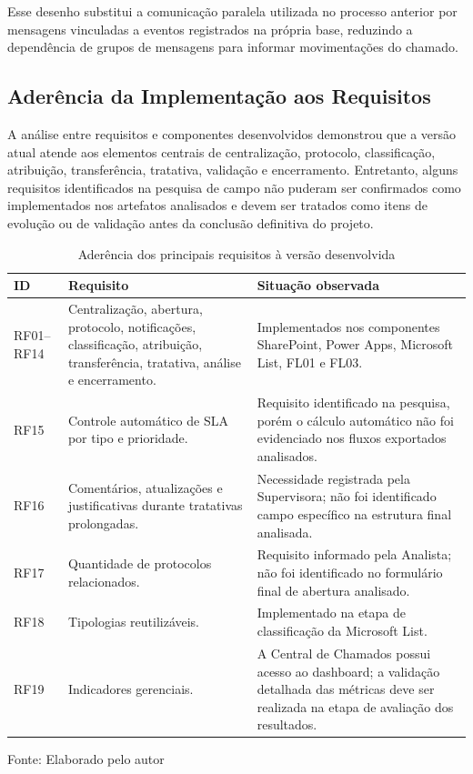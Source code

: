 Esse desenho substitui a comunicação paralela utilizada no
processo anterior por mensagens vinculadas a eventos
registrados na própria base, reduzindo a dependência de
grupos de mensagens para informar movimentações do chamado.

\subsection{Aderência da Implementação aos Requisitos}

A análise entre requisitos e componentes desenvolvidos
demonstrou que a versão atual atende aos elementos centrais
de centralização, protocolo, classificação, atribuição,
transferência, tratativa, validação e encerramento.
Entretanto, alguns requisitos identificados na pesquisa de
campo não puderam ser confirmados como implementados nos
artefatos analisados e devem ser tratados como itens de
evolução ou de validação antes da conclusão definitiva do
projeto.

\begin{table}[H]
\caption{Aderência dos principais requisitos à versão desenvolvida}
\label{tab:aderencia-requisitos}
\centering
\begin{tabular}{p{1.2cm} p{6.6cm} p{4.4cm}}
\hline
\textbf{ID} & \textbf{Requisito} &
\textbf{Situação observada} \\
\hline
RF01--RF14 &
Centralização, abertura, protocolo, notificações,
classificação, atribuição, transferência, tratativa,
análise e encerramento. &
Implementados nos componentes SharePoint, Power Apps,
Microsoft List, FL01 e FL03. \\
\hline
RF15 &
Controle automático de SLA por tipo e prioridade. &
Requisito identificado na pesquisa, porém o cálculo
automático não foi evidenciado nos fluxos exportados
analisados. \\
\hline
RF16 &
Comentários, atualizações e justificativas durante
tratativas prolongadas. &
Necessidade registrada pela Supervisora; não foi
identificado campo específico na estrutura final analisada. \\
\hline
RF17 &
Quantidade de protocolos relacionados. &
Requisito informado pela Analista; não foi identificado no
formulário final de abertura analisado. \\
\hline
RF18 &
Tipologias reutilizáveis. &
Implementado na etapa de classificação da Microsoft List. \\
\hline
RF19 &
Indicadores gerenciais. &
A Central de Chamados possui acesso ao dashboard; a
validação detalhada das métricas deve ser realizada na
etapa de avaliação dos resultados. \\
\hline
\end{tabular}
\raggedright
\par
{\fontsize{10}{12}\selectfont Fonte: Elaborado pelo autor}
\end{table}

